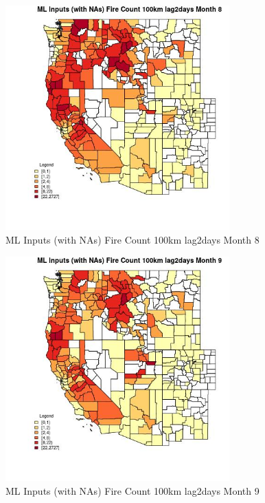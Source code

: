 \begin{figure} 
\centering  
\includegraphics[width=0.77\textwidth]{Code_Outputs/Report_ML_input_PM25_Step4_part_f_de_duplicated_aveswNAs_CountyFire_Count_100km_lag2daysmedianMonth8.jpg} 
\caption{\label{fig:Report_ML_input_PM25_Step4_part_f_de_duplicated_aveswNAsCountyFire_Count_100km_lag2daysmedianMonth8}ML Inputs (with NAs) Fire Count 100km lag2days Month 8} 
\end{figure} 
 

\begin{figure} 
\centering  
\includegraphics[width=0.77\textwidth]{Code_Outputs/Report_ML_input_PM25_Step4_part_f_de_duplicated_aveswNAs_CountyFire_Count_100km_lag2daysmedianMonth9.jpg} 
\caption{\label{fig:Report_ML_input_PM25_Step4_part_f_de_duplicated_aveswNAsCountyFire_Count_100km_lag2daysmedianMonth9}ML Inputs (with NAs) Fire Count 100km lag2days Month 9} 
\end{figure} 
 

